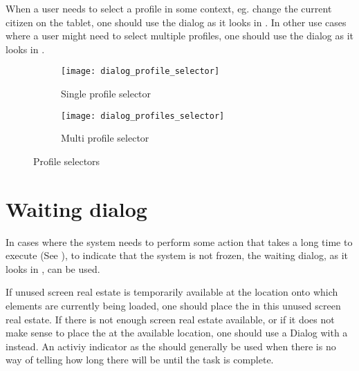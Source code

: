 When a user needs to select a profile in some context, eg. change the current citizen on the tablet, one should use the dialog as it looks in . In other use cases where a user might need to select multiple profiles, one should use the dialog as it looks in .

\begin{figure}[!htbp]
    \centering
    \begin{subfigure}[t]{0.4\textwidth}
    	\centering
        \texttt{[image: dialog\_profile\_selector]}
        \caption{Single profile selector}
        \label{fig:profile_selector_dialog}
    \end{subfigure}
    \hspace{5em}
    \begin{subfigure}[t]{0.4\textwidth}
    	\centering
        \texttt{[image: dialog\_profiles\_selector]}
        \caption{Multi profile selector}
        \label{fig:profiles_selector_dialog}
    \end{subfigure}
    
    \caption{Profile selectors}
    \label{fig:profile_selection}
\end{figure}

\section{Waiting dialog}
\label{sec:waiting_dialog}

In cases where the system needs to perform some action that takes a long time to execute (See ), to indicate that the system is not frozen, the waiting dialog, as it looks in , can be used.

\begin{note}
    If unused screen real estate is temporarily available at the location onto which elements are currently being loaded, one should place the  in this unused screen real estate. If there is not enough screen real estate available, or if it does not make sense to place the  at the available location, one should use a Dialog with a  instead. An activiy indicator as the  should generally be used when there is no way of telling how long there will be until the task is complete. 
\end{note}


